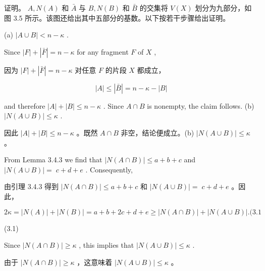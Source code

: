 \documentclass[10pt]{article}
\begin{document}
\begin{tcolorbox}\relax
证明。 \(A,N\left( A\right)\) 和 \(\bar{A}\) 与 \(B,N\left( B\right)\) 和 \(\bar{B}\) 的交集将 \(V\left( X\right)\) 划分为九部分，如图 3.5 所示。该图还给出其中五部分的基数。以下按若干步骤给出证明。
\end{tcolorbox}

(a) \(\left| {A \cup  B}\right|  < n - \kappa\) .

Since \(\left| F\right|  + \left| \bar{F}\right|  = n - \kappa\) for any fragment \(F\) of \(X\) ,

\begin{tcolorbox}\relax
因为 \(\left| F\right|  + \left| \bar{F}\right|  = n - \kappa\) 对任意 \(F\) 的片段 \(X\) 都成立，
\end{tcolorbox}

\[
\left| A\right|  \leq  \left| \bar{B}\right|  = n - \kappa  - \left| B\right|
\]

and therefore \(\left| A\right|  + \left| B\right|  \leq  n - \kappa\) . Since \(A \cap  B\) is nonempty, the claim follows. (b) \(\left| {N\left( {A \cup  B}\right) }\right|  \leq  \kappa\) .

\begin{tcolorbox}\relax
因此 \(\left| A\right|  + \left| B\right|  \leq  n - \kappa\) 。既然 \(A \cap  B\) 非空，结论便成立。(b) \(\left| {N\left( {A \cup  B}\right) }\right|  \leq  \kappa\) 。
\end{tcolorbox}

From Lemma 3.4.3 we find that \(\left| {N\left( {A \cap  B}\right) }\right|  \leq  a + b + c\) and \(\left| {N\left( {A \cup  B}\right) }\right|  = \; c + d + e\) . Consequently,

\begin{tcolorbox}\relax
由引理 3.4.3 得到 \(\left| {N\left( {A \cap  B}\right) }\right|  \leq  a + b + c\) 和 \(\left| {N\left( {A \cup  B}\right) }\right|  = \; c + d + e\) 。因此，
\end{tcolorbox}

\[
{2\kappa } = \left| {N\left( A\right) }\right|  + \left| {N\left( B\right) }\right|  = a + b + {2c} + d + e \geq  \left| {N\left( {A \cap  B}\right) }\right|  + \left| {N\left( {A \cup  B}\right) }\right| .({3.1}
\]

(3.1)

Since \(\left| {N\left( {A \cap  B}\right) }\right|  \geq  \kappa\) , this implies that \(\left| {N\left( {A \cup  B}\right) }\right|  \leq  \kappa\) .

\begin{tcolorbox}\relax
由于 \(\left| {N\left( {A \cap  B}\right) }\right|  \geq  \kappa\) ，这意味着 \(\left| {N\left( {A \cup  B}\right) }\right|  \leq  \kappa\) 。
\end{tcolorbox}
\end{document}
